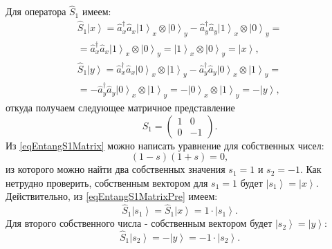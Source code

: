 Для оператора $\hat{S}_1$ имеем:
\begin{eqnarray}
\hat{S}_1 \left|x\right> = \hat{a}_x^{\dag} \hat{a}_x
\left|1\right>_x\otimes\left|0\right>_y - \hat{a}_y^{\dag}
\hat{a}_y\left|1\right>_x\otimes\left|0\right>_y =
\nonumber \\
= 
\hat{a}_x^{\dag} \hat{a}_x
\left|1\right>_x\otimes\left|0\right>_y =
\left|1\right>_x\otimes\left|0\right>_y = \left|x\right>,
\nonumber \\
\hat{S}_1 \left|y\right> = \hat{a}_x^{\dag} \hat{a}_x
\left|0\right>_x\otimes\left|1\right>_y - \hat{a}_y^{\dag}
\hat{a}_y\left|0\right>_x\otimes\left|1\right>_y =
\nonumber \\
=
-\hat{a}_y^{\dag}
\hat{a}_y\left|0\right>_x\otimes\left|1\right>_y
=-\left|0\right>_x\otimes\left|1\right>_y = -\left|y\right>,
\label{eqEntangS1MatrixPre}
\end{eqnarray}
откуда получаем следующее матричное представление
\begin{equation}
\hat{S}_1 = 
\left(
\begin{array}{cc}
1 & 0 \\
0 & -1 
\end{array}
\right).
\label{eqEntangS1Matrix}
\end{equation}
Из \eqref{eqEntangS1Matrix} можно написать уравнение для собственных
чисел:
\[
\left(1-s\right)\left(1 + s\right) = 0,
\]
из которого можно найти два собственных значения $s_1 = 1$ и
$s_2 = -1$. Как нетрудно проверить, собственным вектором для $s_1 = 1$
будет $\left|s_1\right> = \left|x\right>$. Действительно, из \eqref{eqEntangS1MatrixPre}
имеем:
\begin{equation}
\hat{S}_1 \left|s_1\right> = \hat{S}_1 \left|x\right> = 1 \cdot \left|s_1\right>.
\label{eq:part2:pol:stocks_s1_1}
\end{equation}
Для второго собственного числа - собственным вектором будет
$\left|s_2\right> = \left|y\right>$:
\begin{equation}
\hat{S}_1 \left|s_2\right>  = - \left|y\right> = -1 \cdot \left|s_2\right>.
\label{eq:part2:pol:stocks_s1_2}
\end{equation}



